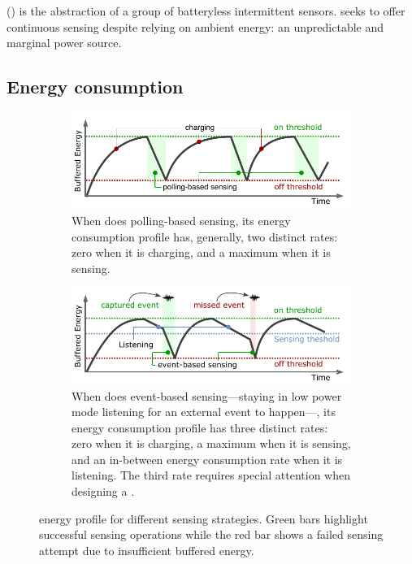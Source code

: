\fullsys (\sys) is the abstraction of a group of batteryless intermittent sensors. \sys seeks to offer continuous sensing despite relying on ambient energy: an unpredictable and marginal power source. 

\subsection{Energy consumption}
%
\begin{figure}[t]
	\centering
		\begin{subfigure}{\columnwidth}
			\includegraphics[width=\columnwidth]{figures/PowerCycleIntermittentSystem}
			\caption{When \sys does polling-based sensing, its energy consumption profile has, generally, two distinct rates: zero when it is charging, and a maximum when it is sensing.}
			\label{fig:pollingBasedSensing}
	\end{subfigure}
	\begin{subfigure}{\columnwidth}
		\includegraphics[width=\columnwidth]{figures/PowerCycleIntermittentSensor}
		\caption{When \sys does event-based sensing---staying in low power mode listening for an external event to happen---, its energy consumption profile has three distinct rates: zero when it is charging, a maximum when it is sensing, and an in-between energy consumption rate when it is listening. The third rate requires special attention when designing a \sys.}
		\label{fig:eventBasedSensing}
\end{subfigure}
		\caption{\fullsys energy profile for different sensing strategies. Green bars highlight successful sensing operations  while the red bar shows a failed sensing attempt due to insufficient buffered energy.}
		\label{fig:cisPwrCycle}
\end{figure} 
